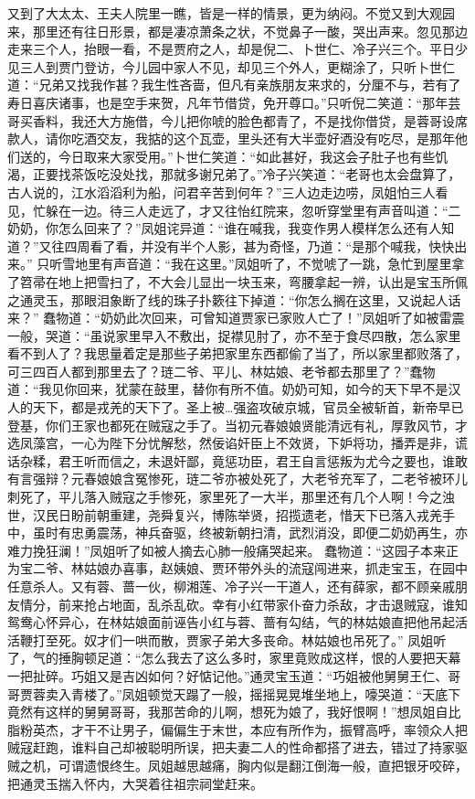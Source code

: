 \documentclass[12pt,oneside]{book}
\begin{document}
又到了大太太、王夫人院里一瞧，皆是一样的情景，更为纳闷。不觉又到大观园来，那里还有往日形景，都是凄凉萧条之状，不觉鼻子一酸，哭出声来。忽见那边走来三个人，抬眼一看，不是贾府之人，却是倪二、卜世仁、冷子兴三个。平日少见三人到贾门登访，今儿园中家人不见，却见三个外人，更糊涂了，只听卜世仁道：“兄弟又找我作甚？我生性吝啬，但凡有亲族朋友来求的，分厘不与，若有了寿日喜庆诸事，也是空手来贺，凡年节借贷，免开尊口。”只听倪二笑道：“那年芸哥买香料，我还大方施借，今儿把你唬的脸色都青了，不是找你借贷，是蓉哥设席款人，请你吃酒交友，我掂的这个瓦壶，里头还有大半壶好酒没有吃尽，是那年他们送的，今日取来大家受用。”卜世仁笑道：“如此甚好，我这会子肚子也有些饥渴，正要找茶饭吃没处找，那就多谢兄弟了。”冷子兴笑道：“老哥也太会盘算了，古人说的，江水滔滔利为船，问君辛苦到何年？”三人边走边唠，凤姐怕三人看见，忙躲在一边。待三人走远了，才又往怡红院来，忽听穿堂里有声音叫道：“二奶奶，你怎么回来了？”凤姐诧异道：“谁在喊我，我变作男人模样怎么还有人知道？”又往四周看了看，并没有半个人影，甚为奇怪，乃道：“是那个喊我，快快出来。”
只听雪地里有声音道：“我在这里。”凤姐听了，不觉唬了一跳，急忙到屋里拿了笤帚在地上把雪扫了，不大会儿显出一块玉来，弯腰拿起一辨，认出是宝玉所佩之通灵玉，那眼泪象断了线的珠子扑簌往下掉道：“你怎么搁在这里，又说起人话来？”
蠢物道：“奶奶此次回来，可曾知道贾家已家败人亡了！”凤姐听了如被雷震一般，哭道：“虽说家里早入不敷出，捉襟见肘了，亦不至于食尽四散，怎么家里看不到人了？我思量着定是那些子弟把家里东西都偷了当了，所以家里都败落了，可三四百人都到那里去了？琏二爷、平儿、林姑娘、老爷都去那里了？”蠢物道：“我见你回来，犹蒙在鼓里，替你有所不值。奶奶可知，如今的天下早不是汉人的天下，都是戎羌的天下了。圣上被…强盗攻破京城，官员全被斩首，新帝早已登基，你们王家也都死在贼寇之手了。当初元春娘娘贤能清远有礼，厚敦风节，才选凤藻宫，一心为陛下分忧解愁，然佞谄奸臣上不效贤，下妒将功，播弄是非，谎话杂糅，君王听而信之，未退奸鄙，竟惩功臣，君王自言惩叛为尤今之要也，谁敢有言强辩？元春娘娘含冤惨死，琏二爷亦被处死了，大老爷充军了，二老爷被环儿刺死了，平儿落入贼寇之手惨死，家里死了一大半，那里还有几个人啊！今之浊世，汉民日盼前朝重建，尧舜复兴，博陈举贤，招揽遗老，惜天下已落入戎羌手中，虽时有忠勇震荡，神兵奋驱，终被新朝扫清，武烈消没，即便二奶奶再生，亦难力挽狂澜！”凤姐听了如被人摘去心肺一般痛哭起来。
蠢物道：“这园子本来正为宝二爷、林姑娘办喜事，赵姨娘、贾环带外头的流寇闯进来，抓走宝玉，在园中任意杀人。又有蓉、蔷一伙，柳湘莲、冷子兴一干道人，还有薛家，都不顾亲戚朋友情分，前来抢占地面，乱杀乱砍。幸有小红带家仆奋力杀敌，才击退贼寇，谁知鸳鸯心怀异心，在林姑娘面前诬告小红与蓉、蔷有勾结，气的林姑娘直把他吊起活活鞭打至死。奴才们一哄而散，贾家子弟大多丧命。林姑娘也吊死了。”
凤姐听了，气的捶胸顿足道：“怎么我去了这么多时，家里竟败成这样，恨的人要把天幕一把扯碎。巧姐又是吉凶如何？好惦记他。”通灵宝玉道：“巧姐被他舅舅王仁、哥哥贾蓉卖入青楼了。”凤姐顿觉天蹋了一般，摇摇晃晃堆坐地上，嚎哭道：“天底下竟然有这样的舅舅哥哥，我那苦命的儿啊，想死为娘了，我好恨啊！”想凤姐自比脂粉英杰，才干不让男子，偏偏生于末世，本应有所作为，振臂高呼，率领众人把贼寇赶跑，谁料自己却被聪明所误，把夫妻二人的性命都搭了进去，错过了持家驱贼之机，可谓遗恨终生。凤姐越思越痛，胸内似是翻江倒海一般，直把银牙咬碎，把通灵玉揣入怀内，大哭着往祖宗祠堂赶来。
\end{document}

